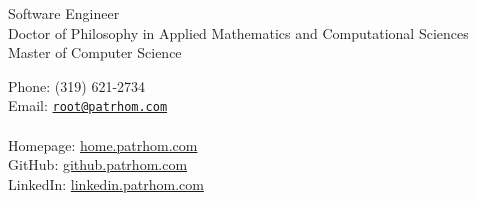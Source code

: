 \begin{minipage}[t]{0.5\textwidth}
  {\LARGE Software Engineer} \vspace{0.5em} \\
  \phantom{1} Doctor of Philosophy in Applied Mathematics and Computational Sciences  \vspace{0.5em} \\
  \phantom{1} Master of Computer Science\\
\end{minipage}
\hfill
\begin{minipage}[t]{0.4\textwidth}
  Phone: (319) 621-2734 \\
  Email: \href{mailto:root@patrhom.com}{\texttt{root@patrhom.com}} \\
  \\
  Homepage: \url{home.patrhom.com} \\
  GitHub: \url{github.patrhom.com} \\
  LinkedIn: \url{linkedin.patrhom.com} \\
\end{minipage}
